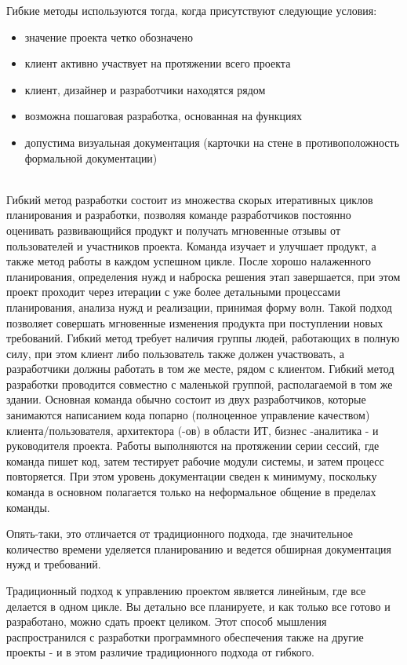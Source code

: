 \documentclass{../industrial-development}
\begin{document}
Гибкие методы используются тогда, когда присутствуют следующие условия:
\begin{itemize}
	\item значение проекта четко обозначено
	\item клиент активно участвует на протяжении всего проекта
	\item клиент, дизайнер и разработчики находятся рядом
	\item возможна пошаговая разработка, основанная на функциях
	\item допустима визуальная документация (карточки на стене в противоположность формальной документации)
\end{itemize} \\
Гибкий метод разработки состоит из множества скорых итеративных циклов планирования и разработки, позволяя команде разработчиков постоянно оценивать развивающийся продукт и получать мгновенные отзывы от пользователей и участников проекта. Команда изучает и улучшает продукт, а также метод работы в каждом успешном цикле. После хорошо налаженного планирования, определения нужд и наброска решения этап завершается, при этом проект проходит через итерации с уже более детальными процессами планирования, анализа нужд и реализации, принимая форму волн. Такой подход позволяет совершать мгновенные изменения продукта при поступлении новых требований. Гибкий метод требует наличия группы людей, работающих в полную силу, при этом клиент либо пользователь также должен участвовать, а разработчики должны работать в том же месте, рядом с клиентом.
Гибкий метод разработки проводится совместно с маленькой группой, располагаемой в том же здании. Основная команда обычно состоит из двух разработчиков, которые занимаются написанием кода попарно (полноценное управление качеством) клиента/пользователя, архитектора (-ов) в области ИТ, бизнес -аналитика - и руководителя проекта. Работы выполняются на протяжении серии сессий, где команда пишет код, затем тестирует рабочие модули системы, и затем процесс повторяется. При этом уровень документации сведен к минимуму, поскольку команда в основном полагается только на неформальное общение в пределах команды.

Опять-таки, это отличается от традиционного подхода, где значительное количество времени уделяется планированию и ведется обширная документация нужд и требований. 

Традиционный подход к управлению проектом является линейным, где все делается в одном цикле. Вы детально все планируете, и как только все готово и разработано, можно сдать проект целиком. Этот способ мышления распространился с разработки программного обеспечения также на другие проекты - и в этом различие традиционного подхода от гибкого.
\end{document}

